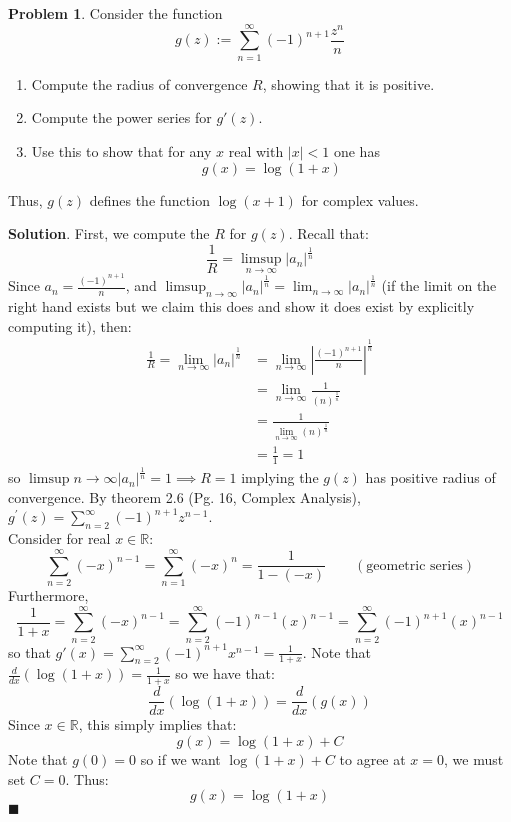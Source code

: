 \documentclass[12pt]{article}
\newcommand{\abs}[1]{\left| #1 \right|} %
\renewcommand{\=}[1]{\stackrel{#1}{=}} %
\providecommand{\RR}{\mathbb{R}}
\theoremstyle{definition}
\newtheorem{p}{Problem}[section]
\theoremstyle{definition}
\newenvironment{s}{%
        \begin{trivlist} \item \textbf{Solution}. }{%
            \hspace*{\fill} $\blacksquare$\end{trivlist}}%
\begin{document}
\begin{p}
    Consider the function
    \[ g(z) := \sum_{n=1}^{\infty} (-1)^{n+1}\frac{z^n}{n} \]
    \begin{enumerate}
        \item Compute the radius of convergence $R$, showing that it is positive.
        \item Compute the power series for $g'(z)$.
        \item Use this to show that for any $x$ real with $\abs{x} < 1$ one has
            \[ g(x) = \log{(1+x)} \]
    \end{enumerate}
    Thus, $g(z)$ defines the function $\log{(x+1)}$ for complex values.
\end{p}
\begin{s}
    First, we compute the $R$ for $g(z)$. Recall that:
    \[ \frac{1}{R} = \limsup_{n\to\infty} \abs{a_n}^{\frac{1}{n}} \]
    Since $a_n = \frac{(-1)^{n+1}}{n}$, and $\limsup_{n\to\infty} \abs{a_n}^{\frac{1}{n}} = \lim_{n\to\infty} \abs{a_n}^{\frac{1}{n}}$ (if
    the limit on the right hand exists but we claim this does and show it does exist by explicitly computing it), then:
    \begin{align*}
        \frac{1}{R} = \lim_{n\to\infty} \abs{a_n}^{\frac{1}{n}} &= \lim_{n\to\infty} \abs{\frac{(-1)^{n+1}}{n}}^{\frac{1}{n}}\\
        &= \lim_{n\to\infty} \frac{1}{(n)^{\frac{1}{n}}} \\
        &= \frac{1}{\lim_{n\to\infty} (n)^{\frac{1}{n}}} \\
        &= \frac{1}{1} = 1
    \end{align*}
    so $\limsup{n\to\infty}\abs{a_n}^{\frac{1}{n}} = 1 \implies R = 1$ implying the $g(z)$ has positive radius of convergence.
    By theorem 2.6 (Pg. 16, Complex Analysis), $g^{'}(z) = \sum_{n=2}^{\infty} (-1)^{n+1}z^{n-1}$.\\
    Consider for real $x\in\mathbb{R}$:
    \[ \sum_{n=2}^{\infty} (-x)^{n-1} = \sum_{n=1}^{\infty} (-x)^n = \frac{1}{1 - (-x)} \qquad (\text{geometric series}) \]
    Furthermore,
    \[ \frac{1}{1+x} = \sum_{n=2}^{\infty} (-x)^{n-1} = \sum_{n=2}^{\infty} (-1)^{n-1}(x)^{n-1} = \sum_{n=2}^{\infty} 
        (-1)^{n+1}(x)^{n-1} \]
    so that $g'(x) = \sum_{n=2}^{\infty} (-1)^{n+1}x^{n-1} = \frac{1}{1+x}$. Note that $\frac{d}{dx}(\log(1+x)) = \frac{1}{1+x}$
    so we have that: 
    \[\frac{d}{dx}(\log{(1+x)}) = \frac{d}{dx}(g(x)) \]
    Since $x\in\RR$, this simply implies that:
    \[ g(x) = \log{(1+x)} + C\]
    Note that $g(0) = 0$ so if we want $\log{(1+x)}+C$ to agree at $x=0$, we must set $C = 0$. Thus:
    \[ g(x) = \log{(1+x)} \]
\end{s}
\end{document}
